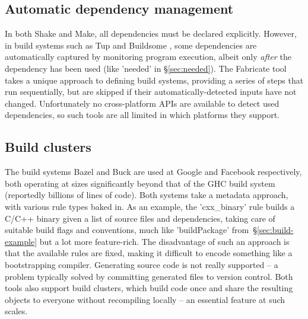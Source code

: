 \subsection{Automatic dependency management}

In both Shake and Make, all dependencies must be declared explicitly. However,
in build systems such as Tup \cite{tup} and Buildsome \cite{buildsome}, some
dependencies are automatically captured by monitoring program execution, albeit
only \emph{after} the dependency has been used (like \lst'needed' in
\S\ref{sec:needed}). The Fabricate tool \cite{fabricate} takes a unique approach
to defining build systems, providing a series of steps that run sequentially,
but are skipped if their automatically-detected inputs have not changed.
Unfortunately no cross-platform APIs are available to detect used dependencies,
so such tools are all limited in which platforms they support.

\subsection{Build clusters}

The build systems Bazel and Buck \cite{buck} are used at Google and Facebook
respectively, both operating at sizes significantly beyond that of the GHC build
system (reportedly billions of lines of code). Both systems take a metadata
approach, with various rule types baked in. As an example, the \lst'cxx_binary'
rule builds a C/C++ binary given a list of source files and dependencies,
taking care of suitable build flags and conventions, much like
\lst'buildPackage' from~\S\ref{sec:build-example} but a lot more feature-rich.
The disadvantage of such an approach is that the available rules are fixed,
making it difficult to encode something like a bootstrapping compiler.
Generating source code is not really supported -- a problem typically solved by
committing generated files to version control. Both tools also support build
clusters, which build code once and share the resulting objects to everyone
without recompiling locally -- an essential feature at such scales.
